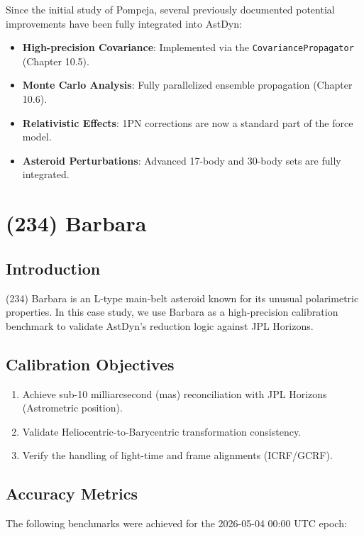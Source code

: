 Since the initial study of Pompeja, several previously documented potential improvements have been fully integrated into AstDyn:
\begin{itemize}
    \item \textbf{High-precision Covariance}: Implemented via the \texttt{CovariancePropagator} (Chapter 10.5).
    \item \textbf{Monte Carlo Analysis}: Fully parallelized ensemble propagation (Chapter 10.6).
    \item \textbf{Relativistic Effects}: 1PN corrections are now a standard part of the force model.
    \item \textbf{Asteroid Perturbations}: Advanced 17-body and 30-body sets are fully integrated.
\end{itemize}

\section{(234) Barbara}
\label{sec:case_barbara}

\subsection{Introduction}

(234) Barbara is an L-type main-belt asteroid known for its unusual polarimetric properties. In this case study, we use Barbara as a high-precision calibration benchmark to validate AstDyn's reduction logic against JPL Horizons.

\subsection{Calibration Objectives}

\begin{enumerate}
    \item Achieve sub-10 milliarcsecond (mas) reconciliation with JPL Horizons (Astrometric position).
    \item Validate Heliocentric-to-Barycentric transformation consistency.
    \item Verify the handling of light-time and frame alignments (ICRF/GCRF).
\end{enumerate}

\subsection{Accuracy Metrics}

The following benchmarks were achieved for the 2026-05-04 00:00 UTC epoch:

